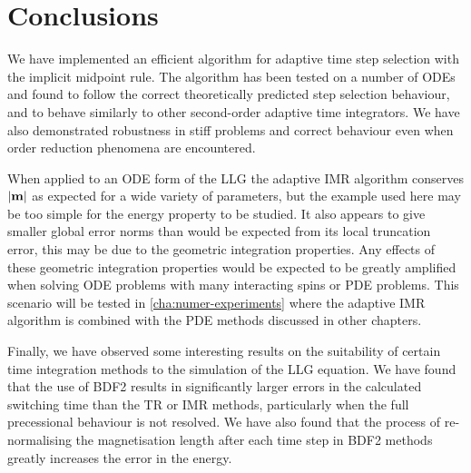\section{Conclusions}

We have implemented an efficient algorithm for adaptive time step selection with the implicit midpoint rule.
The algorithm has been tested on a number of ODEs and found to follow the correct theoretically predicted step selection behaviour, and to behave similarly to other second-order adaptive time integrators.
We have also demonstrated robustness in stiff problems and correct behaviour even when order reduction phenomena are encountered.

When applied to an ODE form of the LLG the adaptive IMR algorithm conserves $\left|{\boldsymbol{\mathrm{m}}} \right|$ as expected for a wide variety of parameters, but the example used here may be too simple for the energy property to be studied.
It also appears to give smaller global error norms than would be expected from its local truncation error, this may be due to the geometric integration properties.
Any effects of these geometric integration properties would be expected to be greatly amplified when solving ODE problems with many interacting spins or PDE problems.
This scenario will be tested in \cref{cha:numer-experiments} where the adaptive IMR algorithm is combined with the PDE methods discussed in other chapters.

Finally, we have observed some interesting results on the suitability of certain time integration methods to the simulation of the LLG equation.
We have found that the use of BDF2 results in significantly larger errors in the calculated switching time than the TR or IMR methods, particularly when the full precessional behaviour is not resolved.
We have also found that the process of re-normalising the magnetisation length after each time step in BDF2 methods greatly increases the error in the energy.


